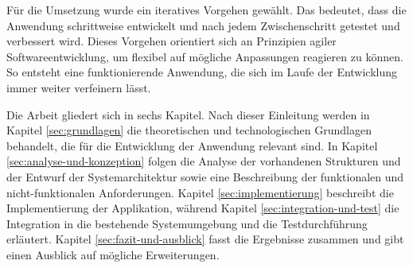 Für die Umsetzung wurde ein iteratives Vorgehen gewählt.
Das bedeutet, dass die Anwendung schrittweise entwickelt und nach jedem Zwischenschritt getestet und verbessert wird.
Dieses Vorgehen orientiert sich an Prinzipien agiler Softwareentwicklung, um flexibel auf mögliche Anpassungen reagieren zu können.
So entsteht eine funktionierende Anwendung, die sich im Laufe der Entwicklung immer weiter verfeinern lässt.

Die Arbeit gliedert sich in sechs Kapitel.
Nach dieser Einleitung werden in Kapitel \ref{sec:grundlagen} die theoretischen und technologischen Grundlagen behandelt, die für die Entwicklung der Anwendung relevant sind.
In Kapitel \ref{sec:analyse-und-konzeption} folgen die Analyse der vorhandenen Strukturen und der Entwurf der Systemarchitektur sowie eine Beschreibung der funktionalen und nicht-funktionalen Anforderungen.
Kapitel \ref{sec:implementierung} beschreibt die Implementierung der Applikation, während Kapitel \ref{sec:integration-und-test} die Integration in die bestehende Systemumgebung und die Testdurchführung erläutert.
Kapitel \ref{sec:fazit-und-ausblick} fasst die Ergebnisse zusammen und gibt einen Ausblick auf mögliche Erweiterungen.



















